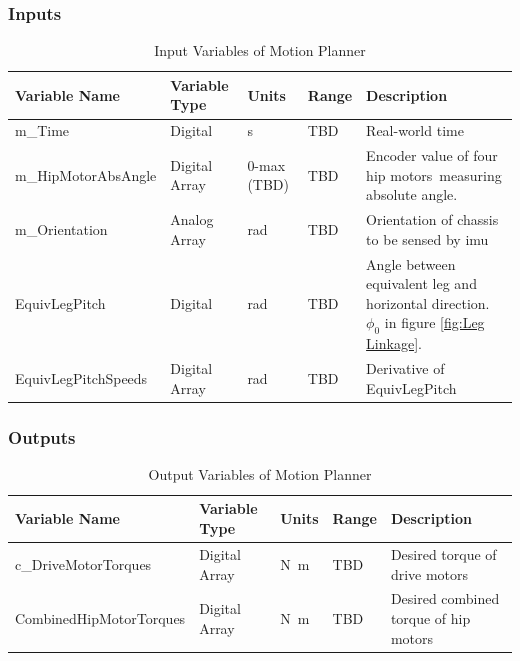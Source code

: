 \documentclass[12pt]{article}
\begin{document}
        \subsubsection{Inputs}
            \begin{table}[H]
              \centering
                \caption{Input Variables of Motion Planner} \label{tbl:Input Variables of Motion Planner}
              \begin{tabularx}{\textwidth}{|p{5cm}|p{1.2cm}|p{1.2cm}|p{1cm}|X|}
                \hline Variable Name & Variable Type & Units & Range & Description \\
                \hline m\_Time & Digital & \unit{\second}  & TBD & Real-world time\\
                \hline m\_HipMotorAbsAngle & Digital Array & 0-max (TBD) & TBD & Encoder value of four hip motors\, measuring absolute angle.\\
                \hline m\_Orientation         & Analog Array  & \unit{\radian} & TBD & Orientation of chassis\, to be sensed by \acrshort{imu}\\
                \hline EquivLegPitch & Digital & rad & TBD & Angle between equivalent leg and horizontal direction. $\phi_0$ in figure \ref{fig:Leg Linkage}.\\
                \hline EquivLegPitchSpeeds & Digital Array & rad & TBD & Derivative of EquivLegPitch\\
                \hline 
              \end{tabularx}
            \end{table}        
            
        \subsubsection{Outputs} 
         \begin{table}[H]
                  \centering
                \caption{Output Variables of Motion Planner} \label{tbl:Output Variables of Motion Planner}
                  \begin{tabularx}{\textwidth}{|p{6cm}|p{1.5cm}|p{1.25cm}|p{1cm}|X|}
                    \hline Variable Name & Variable Type & Units & Range & Description \\
                    \hline c\_DriveMotorTorques   & Digital Array & \unit{N.m} & TBD & Desired torque of drive motors \\
                    \hline CombinedHipMotorTorques     & Digital Array & \unit{N.m} & TBD & Desired combined torque of hip motors   \\
                    \hline                        
             \end{tabularx}
            \end{table}
\end{document}
